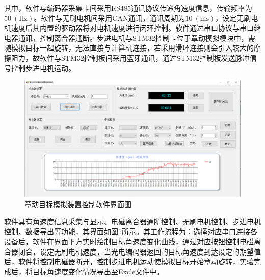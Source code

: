 \documentclass[lang=chs, degree=master, blindreview=false, winfonts=true]{yanputhesis}
\begin{document}
其中，软件与编码器采集卡间采用RS485通讯协议传递角速度信息，传输频率为$50\ (\mathrm{Hz})$。软件与无刷电机间采用CAN通讯，通讯周期为$10\ (\mathrm{ms})$，设定无刷电机速度后其内置的驱动器将对电机速度进行闭环控制。软件通过串口协议与串口继电器通讯，控制离合器通断。步进电机与STM32控制卡位于章动模拟模块中，需随模拟目标一起旋转，无法直接与计算机连接，若采用滑环连接则会引入较大的摩擦阻力，故软件与STM32控制板间采用蓝牙通讯，通过STM32控制板发送脉冲信号控制步进电机运动。
\begin{figure}[htb!]
	\centering
	\includegraphics[width = 5.4in]{picture/software_panel.png}
	\caption{章动目标模拟装置控制软件界面图}
	\label{fig:software_panel}
\end{figure}

软件具有角速度信息采集与显示、电磁离合器通断控制、无刷电机控制、步进电机控制、数据导出等功能，其界面如图\ref{fig:software_panel}所示。其工作流程为：选择对应串口连接各设备后，软件在界面下方实时绘制目标角速度变化曲线，通过对应按钮控制电磁离合器闭合，设定无刷电机速度，当光电编码器返回的目标角速度到达设定的期望值后，软件将控制电磁器断开，控制步进电机运动使模拟目标开始章动旋转，实验完成后，将目标角速度变化情况导出至Excle文件中。
\end{document}
